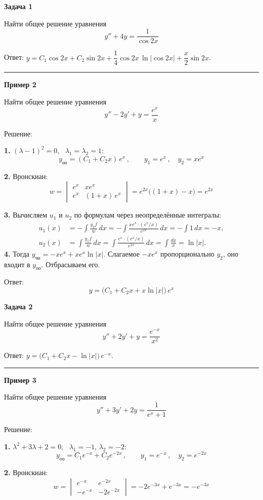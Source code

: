 \documentclass[11pt,a4paper]{article}
\newcommand{\example}[1]{\par\medskip\noindent\textbf{#1}\par\nopagebreak\smallskip}
\newcommand{\yoo}{y_{\text{оо}}}
\newcommand{\ych}{y_{\text{чн}}}
\begin{document}
\example{Задача 1}

Найти общее решение уравнения
\[
  y'' + 4y = \frac{1}{\cos 2x}
\]

Ответ: $y = C_1\cos 2x + C_2\sin 2x + \dfrac14\cos 2x\,\ln|\cos 2x| + \dfrac{x}{2}\sin 2x$.

\medskip\hrule\medskip

\example{Пример 2}

Найти общее решение уравнения
\[
  y'' - 2y' + y = \frac{e^{x}}{x}
\]

Решение:

\textbf{1.} $(\lambda - 1)^2 = 0$, \ $\lambda_1 = \lambda_2 = 1$:
\[
  \yoo = (C_1 + C_2 x)\, e^{x}\,, \qquad y_1 = e^{x}\,, \quad y_2 = x e^{x}
\]

\textbf{2.} Вронскиан:
\[
  w = \begin{vmatrix} e^{x} & x e^{x} \\ e^{x} & (1 + x)\, e^{x} \end{vmatrix} = e^{2x}\bigl((1 + x) - x\bigr) = e^{2x}
\]

\textbf{3.} Вычисляем $u_1$ и $u_2$ по формулам через неопределённые интегралы:
\[
  \begin{aligned}
    u_1(x) &= -\int\frac{y_2f}{w}\,dx
      = -\int\frac{x e^x\cdot(e^x/x)}{e^{2x}}\,dx = -\int 1\,dx = -x,\\
    u_2(x) &= \int\frac{y_1f}{w}\,dx
      = \int\frac{e^x\cdot(e^x/x)}{e^{2x}}\,dx = \int\frac{dx}{x} = \ln|x|.
  \end{aligned}
\]
\textbf{4.} Тогда $\ych = -x e^x + x e^x\ln|x|$.
Слагаемое $-x e^x$ пропорционально $y_2$, оно входит в $\yoo$. Отбрасываем его.

Ответ:
\[
  y = \bigl(C_1 + C_2 x + x\ln|x|\bigr)\, e^{x}
\]

\example{Задача 2}

Найти общее решение уравнения
\[
  y'' + 2y' + y = \frac{e^{-x}}{x^2}
\]

Ответ: $y = \bigl(C_1 + C_2 x - \ln|x|\bigr)\, e^{-x}$.

\medskip\hrule\medskip

\example{Пример 3}

Найти общее решение уравнения
\[
  y'' + 3y' + 2y = \frac{1}{e^{x} + 1}
\]

Решение:

\textbf{1.} $\lambda^2 + 3\lambda + 2 = 0$, \ $\lambda_1 = -1$, $\lambda_2 = -2$:
\[
  \yoo = C_1 e^{-x} + C_2 e^{-2x}\,, \qquad y_1 = e^{-x}\,, \quad y_2 = e^{-2x}
\]

\textbf{2.} Вронскиан:
\[
  w = \begin{vmatrix} e^{-x} & e^{-2x} \\ -e^{-x} & -2e^{-2x} \end{vmatrix} = -2e^{-3x} + e^{-3x} = -e^{-3x}
\]
\end{document}
